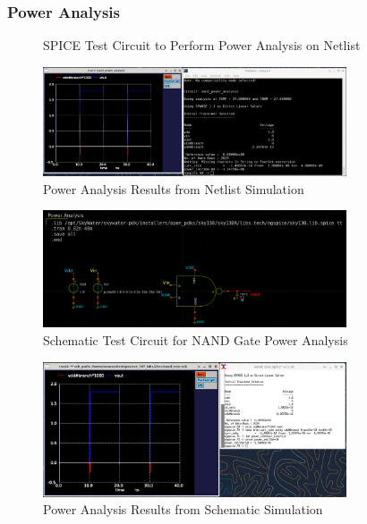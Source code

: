 \documentclass{article}
\begin{document}
	\subsubsection{Power Analysis}
	\begin{figure}[H]
		
		\caption{SPICE Test Circuit to Perform Power Analysis on Netlist}
		\label{fig::nand_power_analysis_test_circuit}
	\end{figure}
	
	\begin{figure}[H]
		\centerline{\includegraphics[width=0.8\textwidth]{nand_power_analysis.png}}
		\caption{Power Analysis Results from Netlist Simulation}
		\label{fig::nand_power_analysis}
	\end{figure}
	
	\begin{figure}[H]
		\centerline{\includegraphics[width=0.8\textwidth]{nand_power_analysis_test_circuit.png}}
		\caption{Schematic Test Circuit for NAND Gate Power Analysis}
		\label{fig::nand_power_analysis_test_circuit_schem}
	\end{figure}
	
	\begin{figure}[H]
		\centerline{\includegraphics[width=0.8\textwidth]{nand_power_analysis_schem.png}}
		\caption{Power Analysis Results from Schematic Simulation}
		\label{fig::nand_power_analysis_schem}
	\end{figure}
	
\end{document}
